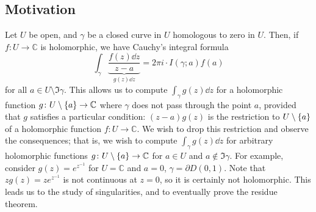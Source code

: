 \subsection{Motivation}
Let \( U \) be open, and \( \gamma \) be a closed curve in \( U \) homologous to zero in \( U \).
Then, if \( f \colon U \to \mathbb C \) is holomorphic, we have Cauchy's integral formula
\[ \int_\gamma \underbrace{\frac{f(z) \dd{z}}{z-a}}_{g(z) \dd{z}} = 2 \pi i \cdot I(\gamma;a) f(a) \]
for all \( a \in U \setminus \Im \gamma \).
This allows us to compute \( \int_\gamma g(z) \dd{z} \) for a holomorphic function \( g \colon U \setminus \qty{a} \to \mathbb C \) where \( \gamma \) does not pass through the point \( a \), provided that \( g \) satisfies a particular condition: \( (z-a) g(z) \) is the restriction to \( U \setminus \qty{a} \) of a holomorphic function \( f \colon U \to \mathbb C \).
We wish to drop this restriction and observe the consequences; that is, we wish to compute \( \int_\gamma g(z) \dd{z} \) for arbitrary holomorphic functions \( g \colon U \setminus \qty{a} \to \mathbb C \) for \( a \in U \) and \( a \not\in \Im \gamma \).
For example, consider \( g(z) = e^{z^{-1}} \) for \( U = \mathbb C \) and \( a = 0 \), \( \gamma = \partial D(0,1) \).
Note that \( zg(z) = ze^{z^{-1}} \) is not continuous at \( z = 0 \), so it is certainly not holomorphic.
This leads us to the study of singularities, and to eventually prove the residue theorem.

